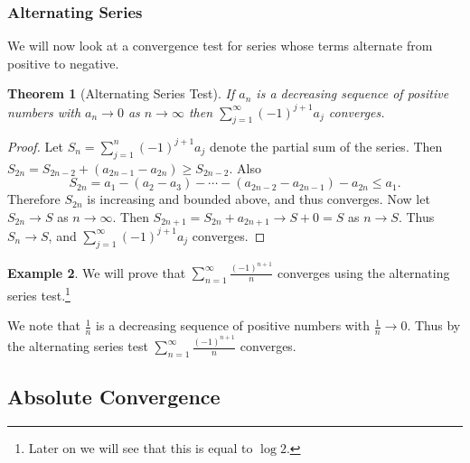 \documentclass[11pt, a4paper]{article}
\newtheorem{theorem}{Theorem}[section]
\theoremstyle{definition}
\newtheorem{example}[theorem]{Example}
\begin{document}

\subsubsection{Alternating Series}

We will now look at a convergence test for series whose terms alternate from positive to negative.

\begin{theorem}[Alternating Series Test]
	If $a_n$ is a decreasing sequence of positive numbers with $a_n \rightarrow 0$ as $n \rightarrow \infty$ then $\sum_{j = 1}^{\infty} (-1)^{j + 1}a_j$ converges.
\end{theorem}
\begin{proof}
	Let $S_n = \sum_{j = 1}^n (-1)^{j + 1}a_j$ denote the partial sum of the series. Then
	$
		S_{2n} = S_{2n - 2} + (a_{2n - 1} - a_{2n}) \geq S_{2n - 2}.
	$
	Also
	$$
		S_{2n} = a_1 - (a_2 - a_3) - \cdots - (a_{2n - 2} - a_{2n - 1}) - a_{2n}
		\leq a_1.
	$$
	Therefore $S_{2n}$ is increasing and bounded above, and thus converges. Now let $S_{2n} \rightarrow S$ as $n \rightarrow \infty$. Then $S_{2n + 1} = S_{2n} + a_{2n + 1} \rightarrow S + 0 = S$ as $n \rightarrow S$. Thus $S_n \rightarrow S$, and $\sum_{j = 1}^{\infty} (-1)^{j + 1}a_j$ converges.
\end{proof}

\begin{example}
	We will prove that $\sum_{n = 1}^{\infty} \frac{(-1)^{n + 1}}{n}$ converges using the alternating series test.\footnote{Later on we will see that this is equal to $\log 2$.}

	We note that $\frac{1}{n}$ is a decreasing sequence of positive numbers with $\frac{1}{n} \rightarrow 0$. Thus by the alternating series test $\sum_{n = 1}^{\infty} \frac{(-1)^{n + 1}}{n}$ converges. 
\end{example}

\subsection{Absolute Convergence}
\end{document}
